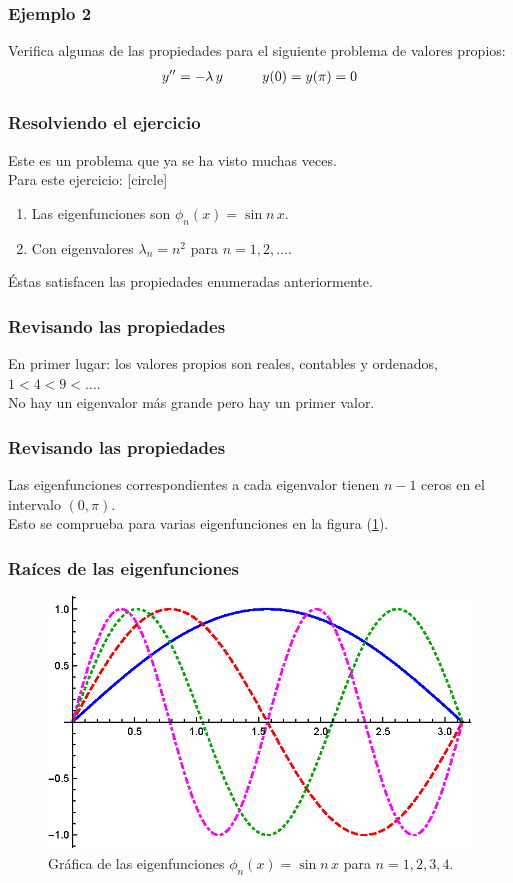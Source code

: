 \documentclass[12pt]{beamer}
\begin{document}
\begin{frame}
\frametitle{Ejemplo 2}
Verifica algunas de las propiedades para el siguiente problema de valores propios:
\pause
\begin{align*}
{y}^{\prime \prime} = - \lambda \, y \hspace{1cm} y(0) = y(\pi) = 0
\end{align*}
\end{frame}
\begin{frame}
\frametitle{Resolviendo el ejercicio}
Este es un problema que ya se ha visto muchas veces.
\\
\bigskip
\pause
Para este ejercicio:
[circle]
\begin{enumerate}[<+->]
\item Las eigenfunciones son $\phi_{n} (x) = \sin n\, x$.
\item Con eigenvalores $\lambda_{n} = n^{2}$ para $n = 1, 2, \ldots$.
\end{enumerate}
\pause
Éstas satisfacen las propiedades enumeradas anteriormente.
\end{frame}
\begin{frame}
\frametitle{Revisando las propiedades}
En primer lugar: \pause los valores propios son reales, contables y ordenados, $1 < 4 < 9 < \ldots$.
\\
\bigskip
\pause
No hay un eigenvalor más grande pero hay un primer valor.
\end{frame}
\begin{frame}
\frametitle{Revisando las propiedades}
Las eigenfunciones correspondientes a cada eigenvalor tienen $n -1$ ceros en el intervalo $(0, \pi)$.
\\
\bigskip
\pause
Esto se comprueba para varias eigenfunciones en la figura (\ref{fig:figura_04_01}).
\end{frame}
\begin{frame}
\frametitle{Raíces de las eigenfunciones}
\begin{figure}[H]
\centering
\includegraphics[scale=1]{Imagenes/Eigenfunciones_Sin_nx.eps}
\caption{Gráfica de las eigenfunciones $\phi_{n} (x) = \sin n \,x$ para $n = 1, 2, 3, 4$.}
\label{fig:figura_04_01}
\end{figure}
\end{frame}
\end{document}
